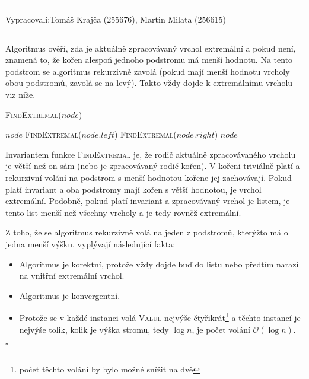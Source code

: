 \documentclass[12pt]{article}
\newcommand{\la}{\leftarrow}
\renewcommand{\O}{\mathcal{O}}
\newcommand{\zadani}[2]{
{\large
\noindent {\bf IB108 \hfill{} Sada #1, Příklad #2 \\[-4mm]}
\noindent\hrule
\vspace{2mm}
\noindent Vypracovali:\hfill{}Tomáš Krajča (255676), Martin Milata (256615)
\vspace{3mm}
\hrule
\bigskip\bigskip}
}
\begin{document}
\clearpage
\zadani{2}{5}

\noindent
Algoritmus ověří, zda je aktuálně zpracovávaný vrchol extremální a pokud není, znamená to, že kořen
alespoň jednoho podstromu má menší hodnotu. Na tento podstrom se algoritmus rekurzivně zavolá (pokud
mají menší hodnotu vrcholy obou podstromů, zavolá se na levý). Takto vždy dojde k extremálnímu
vrcholu -- viz níže.


\begin{algorithm}
\textsc{FindExtremal}($node$)
\begin{algorithmic}
\RETURN $node$
\RETURN \textsc{FindExtremal}($node.left$)
\RETURN \textsc{FindExtremal}($node.right$)
\ELSE
\RETURN $node$
\ENDIF
\end{algorithmic}
\end{algorithm}

Invariantem funkce \textsc{FindExtremal} je, že rodič aktuálně zpracovávaného vrcholu je větší než
on sám (nebo je zpracovávaný rodič kořen). V kořeni triviálně platí a rekurzivní volání na podstrom
s menší hodnotou kořene jej zachovávají. Pokud platí invariant a oba podstromy mají kořen s větší
hodnotou, je vrchol extremální. Podobně, pokud platí invariant a zpracovávaný vrchol je listem, je
tento list menší než všechny vrcholy a je tedy rovněž extremální.

Z toho, že se algoritmus rekurzivně volá na jeden z podstromů, kterýžto má o jedna menší výšku,
vyplývají následující fakta:

\begin{itemize}
\item Algoritmus je korektní, protože vždy dojde buď do listu nebo předtím narazí na vnitřní
extremální vrchol.
\item Algoritmus je konvergentní.
\item Protože se v každé instanci volá \textsc{Value} nejvýše čtyřikrát\footnote{počet těchto volání
by bylo možné snížit na dvě} a těchto instancí je nejvýše tolik, kolik je výška stromu, tedy $\log
n$, je počet volání $\O(\log n)$.
\end{itemize}

\hfill$\square$
\end{document}
